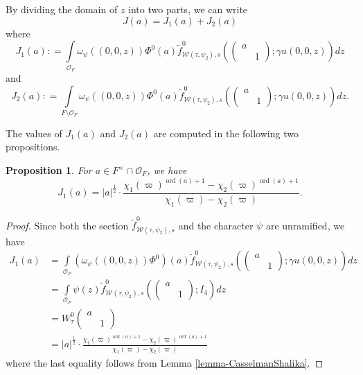 \documentclass[11pt]{amsart}
\newtheorem{proposition}[theorem]{Proposition}
\theoremstyle{definition}
\theoremstyle{remark}
\newcommand{\on}{\operatorname}
\newcommand{\ord}{\on{ord}}
\begin{document}
By dividing the domain of $z$ into two parts, we can write
$$
J(a)=J_1(a)+J_2(a)
$$
where
\begin{equation*}
J_1(a) : = \int\limits_{\mathcal{O}_F}   \omega_\psi( (0, 0, z))  \Phi^0(a)       \tilde{f}_{\mathcal{W}(\tau,\psi_2), s} ^0  \left(  \left(\begin{smallmatrix} a &\\&1  \end{smallmatrix}\right) ; \gamma u(0, 0, z)  \right)   
  dz 
\end{equation*}
and 
\begin{equation*}
J_2(a) : =  \int\limits_{F \setminus  \mathcal{O}_F}   \omega_\psi( (0, 0, z))  \Phi^0(a)       \tilde{f}_{\mathcal{W}(\tau,\psi_2), s} ^0  \left(  \left(\begin{smallmatrix} a &\\&1  \end{smallmatrix}\right) ; \gamma u(0, 0, z)  \right)   
  dz .
\end{equation*}

The values of $J_1(a)$ and $J_2(a)$ are computed in the following two propositions. 

\begin{proposition}
For $a\in F^\times \cap \mathcal{O}_F$, we have 
\begin{equation}
J_1(a)=  |a|^{\frac{1}{2}} \cdot \frac{\chi_1(\varpi)^{\ord(a)+1}-\chi_2(\varpi)^{\ord(a)+1}}{\chi_1(\varpi)-\chi_2(\varpi)}.
\label{eq-unramified-J1}
\end{equation}
\label{prop-unramified-J1}
\end{proposition}

\begin{proof}
Since both the section $\tilde{f}_{\mathcal{W}(\tau,\psi_2), s} ^0$ and the character $\psi$ are unramified, we have 
\begin{equation*}
\begin{split}
J_1(a)  &= \int\limits_{\mathcal{O}_F}   \left(\omega_\psi( (0, 0, z))  \Phi^0\right)(a)      \tilde{f}_{\mathcal{W}(\tau,\psi_2), s} ^0  \left( \left(\begin{smallmatrix} a &\\&1  \end{smallmatrix}\right) ; \gamma u(0, 0, z)  \right)   
  dz   \\
  &= \int\limits_{\mathcal{O}_F}  \psi(z)   \tilde{f}_{\mathcal{W}(\tau,\psi_2), s} ^0  \left( \left(\begin{smallmatrix} a &\\&1  \end{smallmatrix}\right) ; I_4 \right)   
  dz \\
  &=W_\tau^0 \left( \begin{smallmatrix} a&\\  &1\end{smallmatrix}\right) \\
  &= |a|^{\frac{1}{2}} \cdot  \frac{\chi_1(\varpi)^{\ord(a)+1}-\chi_2(\varpi)^{\ord(a)+1}}{\chi_1(\varpi)-\chi_2(\varpi)}
  \end{split}
\end{equation*}
where the last equality follows from Lemma \ref{lemma-CasselmanShalika}.
\end{proof}
\end{document}
